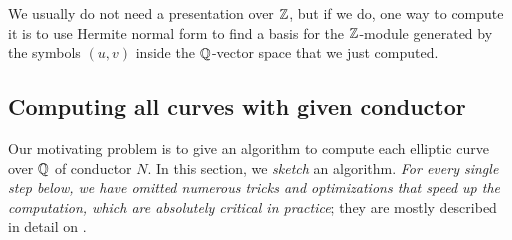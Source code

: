 \documentclass{book}
\begin{document}
We usually do not need a presentation over $\mathbb{Z}$, but
if we do, one way to compute it is to use Hermite normal form
to find a basis for the $\mathbb{Z}$-module
generated by the symbols $(u,v)$ inside the $\mathbb{Q}$-vector space
that we just computed.

\subsection{Computing all curves with given conductor}
\label{sec:computecurvesgivenconductor}

Our motivating problem is to give an algorithm to compute
each elliptic curve over $\mathbb{Q}$ of conductor $N$.
In this section, we {\em sketch} an algorithm.
{\em For every single step below, we have omitted
numerous tricks and optimizations
that speed up the computation, which
are absolutely critical in practice}; they are mostly
described in detail on \cite{cremona:algs}.
\end{document}
